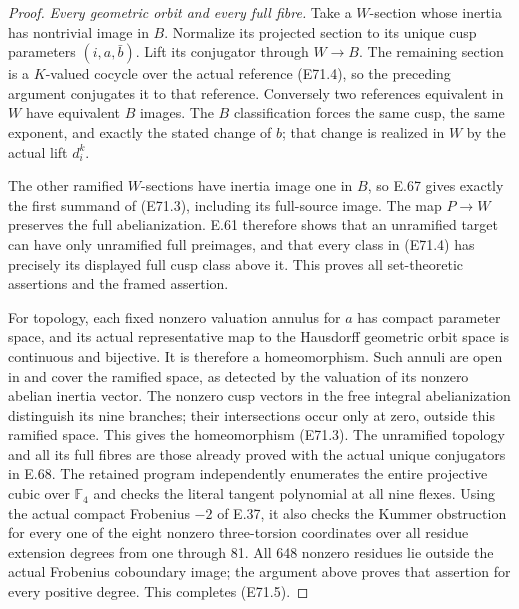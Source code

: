 \begin{proof}
\emph{Every geometric orbit and every full fibre.}
Take a $W$-section whose inertia has nontrivial
image in $B$. Normalize its projected section
to its unique cusp parameters $(i,a,\bar b)$.
Lift its conjugator through $W\to B$.
The remaining section is a $K$-valued cocycle
over the actual reference (E71.4), so the
preceding argument conjugates it to that
reference. Conversely two references
equivalent in $W$ have equivalent $B$ images.
The $B$ classification forces the same cusp,
the same exponent, and exactly the stated
change of $b$; that change is realized in
$W$ by the actual lift $d_i^k$.

The other ramified $W$-sections have inertia
image one in $B$, so E.67 gives exactly the
first summand of (E71.3), including its
full-source image. The map $P\to W$ preserves
the full abelianization. E.61 therefore shows
that an unramified target can have only
unramified full preimages, and that every
class in (E71.4) has precisely its displayed
full cusp class above it. This proves all
set-theoretic assertions and the framed
assertion.

For topology, each fixed nonzero valuation
annulus for $a$ has compact parameter space,
and its actual representative map to the
Hausdorff geometric orbit space is continuous
and bijective. It is therefore a homeomorphism.
Such annuli are open in and cover the ramified
space, as detected by the valuation of its nonzero
abelian inertia vector. The
nonzero cusp vectors in the free integral
abelianization distinguish its nine branches;
their intersections occur only at zero,
outside this ramified space. This gives the
homeomorphism (E71.3). The unramified topology
and all its full fibres are those already
proved with the actual unique conjugators
in E.68. The retained program independently enumerates
the entire projective cubic over $\mathbb F_4$ and
checks the literal tangent polynomial at all nine flexes.
Using the actual compact Frobenius $-2$ of E.37, it
also checks the Kummer obstruction for every one of
the eight nonzero three-torsion coordinates over
all residue extension degrees from one through 81.
All 648 nonzero residues lie outside the actual
Frobenius coboundary image; the argument above
proves that assertion for every positive degree.
This completes (E71.5).
\end{proof}
